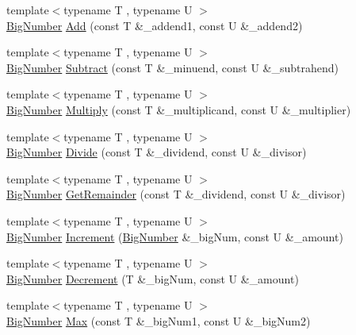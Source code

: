 \begin{DoxyCompactItemize}
\item 
{\footnotesize template$<$typename T , typename U $>$ }\\\mbox{\hyperlink{class_big_nums_1_1_big_number}{Big\+Number}} \mbox{\hyperlink{namespace_big_nums_aa720921bc4bb5c07e5eaaa94ea2fbdd4}{Add}} (const T \&\+\_\+addend1, const U \&\+\_\+addend2)
\item 
{\footnotesize template$<$typename T , typename U $>$ }\\\mbox{\hyperlink{class_big_nums_1_1_big_number}{Big\+Number}} \mbox{\hyperlink{namespace_big_nums_af7374fc61c13d901a5544cf75f9aa607}{Subtract}} (const T \&\+\_\+minuend, const U \&\+\_\+subtrahend)
\item 
{\footnotesize template$<$typename T , typename U $>$ }\\\mbox{\hyperlink{class_big_nums_1_1_big_number}{Big\+Number}} \mbox{\hyperlink{namespace_big_nums_a0fd0171f6ec3841100d2aac76a1ad3b2}{Multiply}} (const T \&\+\_\+multiplicand, const U \&\+\_\+multiplier)
\item 
{\footnotesize template$<$typename T , typename U $>$ }\\\mbox{\hyperlink{class_big_nums_1_1_big_number}{Big\+Number}} \mbox{\hyperlink{namespace_big_nums_a5509ae7c6fe5bd643f0b70813af082e4}{Divide}} (const T \&\+\_\+dividend, const U \&\+\_\+divisor)
\item 
{\footnotesize template$<$typename T , typename U $>$ }\\\mbox{\hyperlink{class_big_nums_1_1_big_number}{Big\+Number}} \mbox{\hyperlink{namespace_big_nums_a61b932319b89265b00a55e8dcce77b0e}{Get\+Remainder}} (const T \&\+\_\+dividend, const U \&\+\_\+divisor)
\item 
{\footnotesize template$<$typename T , typename U $>$ }\\\mbox{\hyperlink{class_big_nums_1_1_big_number}{Big\+Number}} \mbox{\hyperlink{namespace_big_nums_ab73d728e998902ee2db1af69619b7573}{Increment}} (\mbox{\hyperlink{class_big_nums_1_1_big_number}{Big\+Number}} \&\+\_\+big\+Num, const U \&\+\_\+amount)
\item 
{\footnotesize template$<$typename T , typename U $>$ }\\\mbox{\hyperlink{class_big_nums_1_1_big_number}{Big\+Number}} \mbox{\hyperlink{namespace_big_nums_a5ade9d910a990dfe7a21a3015d2a523a}{Decrement}} (T \&\+\_\+big\+Num, const U \&\+\_\+amount)
\item 
{\footnotesize template$<$typename T , typename U $>$ }\\\mbox{\hyperlink{class_big_nums_1_1_big_number}{Big\+Number}} \mbox{\hyperlink{namespace_big_nums_a6ae2ed93d9956ac117c4fc399b72aee7}{Max}} (const T \&\+\_\+big\+Num1, const U \&\+\_\+big\+Num2)

\end{DoxyCompactItemize}
